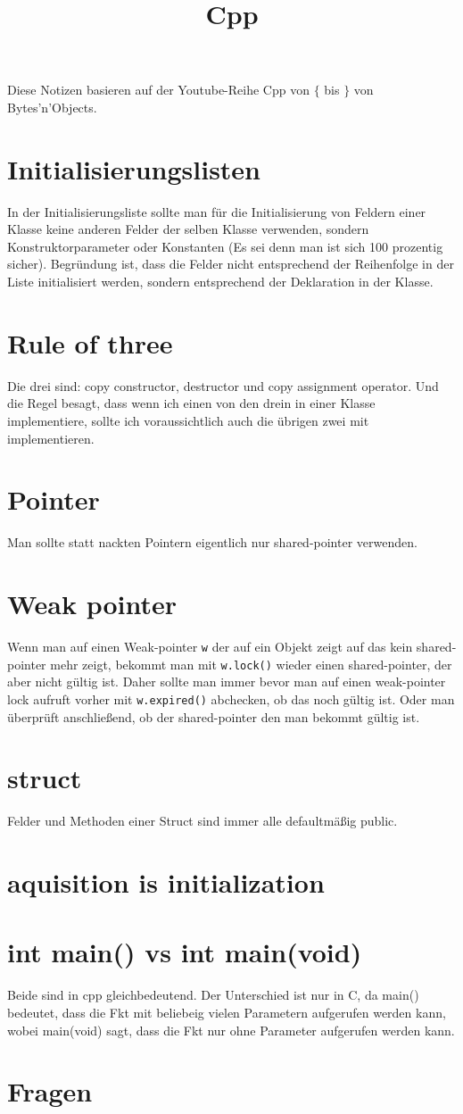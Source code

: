 \documentclass[paper=a4,10pt]{scrartcl}
\begin{document}
\title{Cpp}
Diese Notizen basieren auf der Youtube-Reihe Cpp von $\{$ bis $\}$ von Bytes'n'Objects. 


\section{Initialisierungslisten}
In der Initialisierungsliste sollte man für die Initialisierung von Feldern einer Klasse keine anderen Felder der selben Klasse verwenden, sondern Konstruktorparameter oder Konstanten (Es sei denn man ist sich 100 prozentig sicher). Begründung ist, dass die Felder nicht entsprechend der Reihenfolge in der Liste initialisiert werden, sondern entsprechend der Deklaration in der Klasse.

\section{Rule of three}
Die drei sind: copy constructor, destructor und copy assignment operator. Und die Regel besagt, dass wenn ich einen von den drein in einer Klasse implementiere, sollte ich voraussichtlich auch die übrigen zwei mit implementieren.

\section{Pointer}
Man sollte statt nackten Pointern eigentlich nur shared-pointer verwenden.

\section{Weak pointer}
Wenn man auf einen Weak-pointer \texttt{w} der auf ein Objekt zeigt auf das kein shared-pointer mehr zeigt, bekommt man mit \texttt{w.lock()} wieder einen shared-pointer, der aber nicht gültig ist. Daher sollte man immer bevor man auf einen weak-pointer lock aufruft vorher mit \texttt{w.expired()} abchecken, ob das noch gültig ist. Oder man überprüft anschließend, ob der shared-pointer den man bekommt gültig ist. 

\section{struct}
Felder und Methoden einer Struct sind immer alle defaultmäßig public.

\section{aquisition is initialization}


\section{int main() vs int main(void)}
Beide sind in cpp gleichbedeutend. Der Unterschied ist nur in C, da main() bedeutet, dass die Fkt mit beliebeig vielen Parametern aufgerufen werden kann, wobei main(void) sagt, dass die Fkt nur ohne Parameter aufgerufen werden kann.


\section{Fragen}
\end{document}
